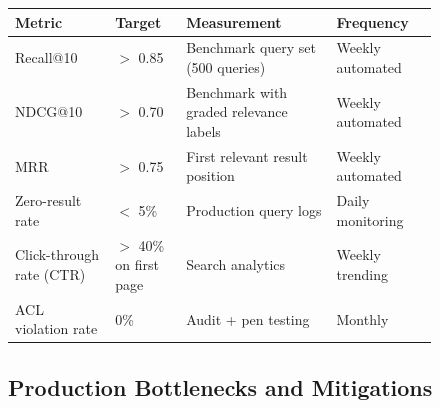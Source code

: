 \small
\begin{tabular}{|p{0.20\linewidth}|p{0.14\linewidth}|p{0.30\linewidth}|p{0.20\linewidth}|}
\hline
\textbf{Metric} & \textbf{Target} & \textbf{Measurement} & \textbf{Frequency} \\
\hline
Recall@10 & $>$ 0.85 & Benchmark query set (500 queries) & Weekly automated \\
\hline
NDCG@10 & $>$ 0.70 & Benchmark with graded relevance labels & Weekly automated \\
\hline
MRR & $>$ 0.75 & First relevant result position & Weekly automated \\
\hline
Zero-result rate & $<$ 5\% & Production query logs & Daily monitoring \\
\hline
Click-through rate (CTR) & $>$ 40\% on first page & Search analytics & Weekly trending \\
\hline
ACL violation rate & 0\% & Audit + pen testing & Monthly \\
\hline
\end{tabular}
\normalsize

\subsection*{Production Bottlenecks and Mitigations}

